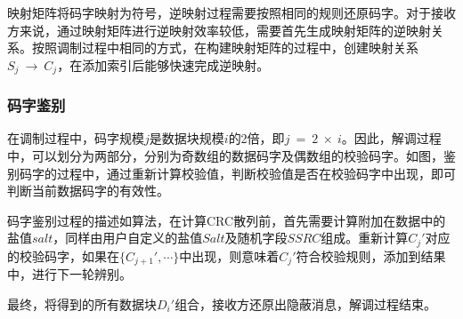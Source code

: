 映射矩阵将码字映射为符号，逆映射过程需要按照相同的规则还原码字。对于接收方来说，通过映射矩阵进行逆映射效率较低，需要首先生成映射矩阵的逆映射关系。按照调制过程中相同的方式，在构建映射矩阵的过程中，创建映射关系$S_{j}\ \rightarrow\ C_{j}$，在添加索引后能够快速完成逆映射。


\subsubsection{码字鉴别}
\label{chap:zigzag:model:demodulation:identification}

在调制过程中，码字规模$j$是数据块规模$i$的2倍，即$j\ =\ 2\ \times\ i$。因此，解调过程中，可以划分为两部分，分别为奇数组的数据码字及偶数组的校验码字。如图，鉴别码字的过程中，通过重新计算校验值，判断校验值是否在校验码字中出现，即可判断当前数据码字的有效性。

码字鉴别过程的描述如算法，在计算CRC散列前，首先需要计算附加在数据中的盐值$salt$，同样由用户自定义的盐值$Salt$及随机字段$SSRC$组成。重新计算$C_{j}'$对应的校验码字，如果在$\{C_{j+1}',\cdots\}$中出现，则意味着$C_{j}'$符合校验规则，添加到结果中，进行下一轮辨别。

最终，将得到的所有数据块$D_{i}'$组合，接收方还原出隐蔽消息，解调过程结束。